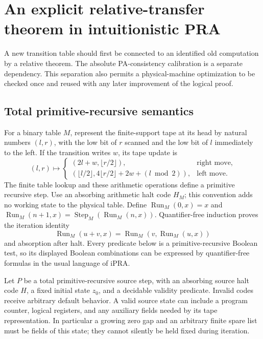 \section{An explicit relative-transfer theorem in intuitionistic PRA}
\label{sec:mathaudit-relative}

A new transition table should first be connected to an identified old
computation by a relative theorem.  The absolute PA-consistency calibration
is a separate dependency.  This separation also permits a physical-machine
optimization to be checked once and reused with any later improvement of
the logical proof.

\subsection{Total primitive-recursive semantics}

For a binary table $M$, represent the finite-support tape at its head by
natural numbers $(l,r)$, with the low bit of $r$ scanned and the low bit of
$l$ immediately to the left.  If the transition writes $w$, its tape update
is
\[
 (l,r)\longmapsto
 \begin{cases}
 (2l+w,\lfloor r/2\rfloor),&\text{right move},\\
 (\lfloor l/2\rfloor,4\lfloor r/2\rfloor+2w+(l\bmod2)),&\text{left move}.
 \end{cases}
\]
The finite table lookup and these arithmetic operations define a primitive
recursive step.  Use an absorbing arithmetic halt code $H_M$; this convention
adds no working state to the physical table.  Define
$\operatorname{Run}_M(0,x)=x$ and
$\operatorname{Run}_M(n+1,x)=\operatorname{Step}_M(
\operatorname{Run}_M(n,x))$.
Quantifier-free induction proves the iteration identity
\[
 \operatorname{Run}_M(u+v,x)
 =\operatorname{Run}_M(v,\operatorname{Run}_M(u,x))
\]
and absorption after halt.  Every predicate below is a primitive-recursive
Boolean test, so its displayed Boolean combinations can be expressed by
quantifier-free formulas in the usual language of iPRA.

Let $P$ be a total primitive-recursive source step, with an absorbing
source halt code $H$, a fixed initial state $z_0$, and a decidable validity
predicate.  Invalid codes receive arbitrary default behavior.  A valid
source state can include a program counter, logical registers, and any
auxiliary fields needed by its tape representation.  In particular a
growing zero gap and an arbitrary finite spare list must be fields of
this state; they cannot silently be held fixed during iteration.

